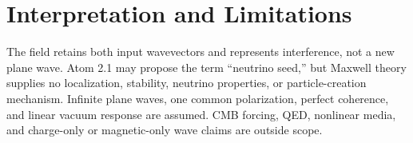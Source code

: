 \documentclass[11pt]{article}
\begin{document}
\section{Interpretation and Limitations}
The field retains both input wavevectors and represents interference, not a new plane
wave. Atom 2.1 may propose the term ``neutrino seed,'' but Maxwell theory supplies no
localization, stability, neutrino properties, or particle-creation mechanism. Infinite
plane waves, one common polarization, perfect coherence, and linear vacuum response are
assumed. CMB forcing, QED, nonlinear media, and charge-only or magnetic-only wave claims
are outside scope.



\end{document}
